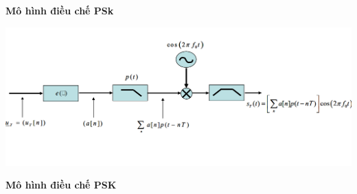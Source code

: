 \newpage
\textbf{Mô hình điều chế PSk}
\begin{center}
    \includegraphics[scale=.6]{Img/bieudoASK.png}
\end{center}
\begin{center}
    \textbf{Mô hình điều chế PSK}
\end{center}

\newpage
